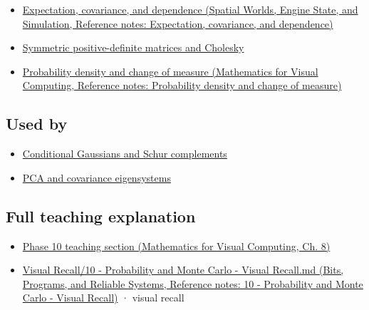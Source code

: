 \begin{itemize}
\tightlist
\item
  \href{../05-Spatial-Worlds-Engine-State-and-Simulation/main.pdf\#nameddest=appendix-54c383df9992}{Expectation, covariance, and dependence (Spatial Worlds, Engine State, and Simulation, Reference notes: Expectation, covariance, and dependence)}
\item
  \hyperref[appendix-50d2ea3c9b26]{Symmetric positive-definite matrices and Cholesky}
\item
  \href{../02-Mathematics-for-Visual-Computing/main.pdf\#nameddest=appendix-4815cd87ab8b}{Probability density and change of measure (Mathematics for Visual Computing, Reference notes: Probability density and change of measure)}
\end{itemize}

\subsection{Used by}\label{appendix-12bbe185dbe5-used-by}

\hypertarget{appendix-12bbe185dbe5-used-by}{}

\begin{itemize}
\tightlist
\item
  \hyperref[appendix-f0437ea55a47]{Conditional Gaussians and Schur complements}
\item
  \hyperref[appendix-ad175ef3c5bf]{PCA and covariance eigensystems}
\end{itemize}

\subsection{Full teaching explanation}\label{appendix-12bbe185dbe5-full-teaching-explanation}

\hypertarget{appendix-12bbe185dbe5-full-teaching-explanation}{}

\begin{itemize}
\tightlist
\item
  \href{../02-Mathematics-for-Visual-Computing/main.pdf\#nameddest=02-foundations-ii-ch024-waiting-times-event-counts-and-covariance-geometry}{Phase 10 teaching section (Mathematics for Visual Computing, Ch. 8)}
\item
  \href{../01-Bits-Programs-and-Reliable-Systems/main.pdf\#nameddest=appendix-cb5af353ef77}{Visual Recall/10 - Probability and Monte Carlo - Visual Recall.md (Bits, Programs, and Reliable Systems, Reference notes: 10 - Probability and Monte Carlo - Visual Recall)} · visual recall
\end{itemize}

